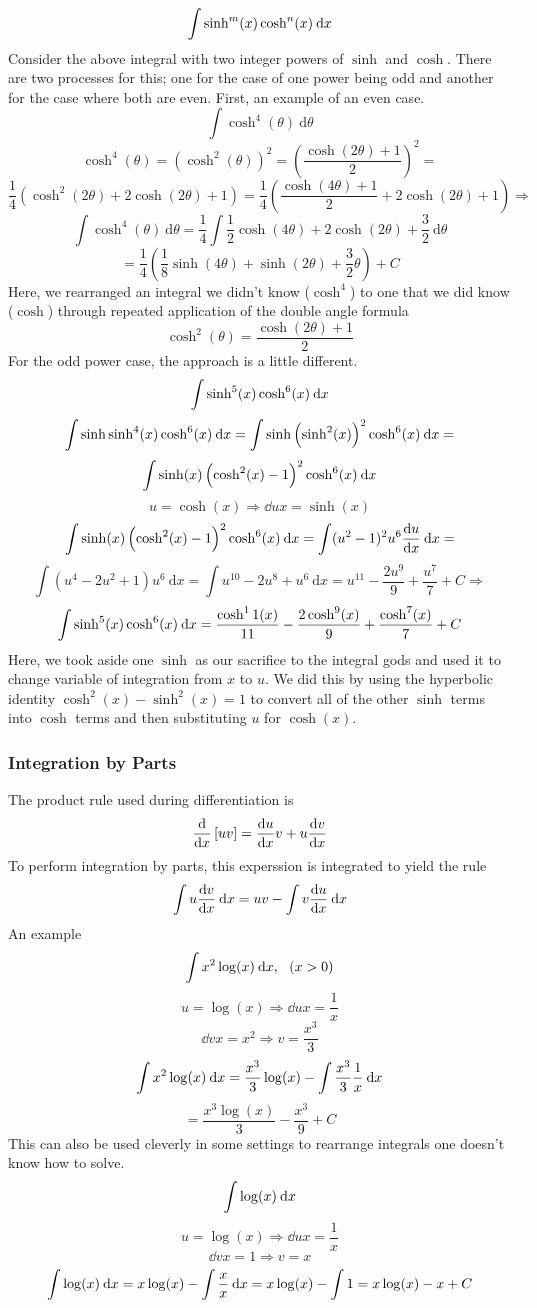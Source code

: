 \documentclass[12pt]{report}
\begin{document}
\begin{flushleft}
\[\int \sinh^m(x)\cosh^n(x)\:\mathrm{d}x\]
Consider the above integral with two integer powers of \(\sinh\) and \(\cosh\).
There are two processes for this; one for the case of one power being odd and
another for the case where both are even. First, an example of an even case.
\[\int \cosh^4(\theta) \:\mathrm{d}\theta\]
\[\cosh^4(\theta) = \left(\cosh^2(\theta)\right)^2 
= \left(\frac{\cosh(2\theta) + 1}{2}\right)^2 = \]
\[\frac{1}{4}\left(\cosh^2(2\theta) + 2\cosh(2\theta) + 1\right) 
= \frac{1}{4}\left(\frac{\cosh(4\theta) + 1}{2} + 2\cosh(2\theta) + 1\right)
\Rightarrow \]
\[\int \cosh^4(\theta) \:\mathrm{d}\theta = \frac{1}{4}\int\frac{1}{2}
\cosh(4\theta) + 2\cosh(2\theta) + \frac{3}{2}  \:\mathrm{d}\theta\]
\[= \frac{1}{4}\left(\frac{1}{8}\sinh(4\theta) + \sinh(2\theta) 
+ \frac{3}{2}\theta\right) + C\]
Here, we rearranged an integral we didn't know (\(\cosh^4\)) to one that we did
know (\(\cosh\)) through repeated application of the double angle formula
\[\cosh^2(\theta) = \frac{\cosh(2\theta) + 1}{2}\]
For the odd power case, the approach is a little different.
\[\int\sinh^5(x)\cosh^6(x)\:\mathrm{d}x\]
\[\int\sinh\sinh^4(x)\cosh^6(x)\:\mathrm{d}x = \int\sinh\left(\sinh^2(x)\right)^2
\cosh^6(x)\:\mathrm{d}x = \]
\[\int\sinh(x)\left(\cosh^2(x) - 1\right)^2\cosh^6(x)\:\mathrm{d}x\]
\[u = \cosh(x) \Rightarrow \dd{u}{x} = \sinh(x)\]
\[\int\sinh(x)\left(\cosh^2(x) - 1\right)^2\cosh^6(x)\:\mathrm{d}x 
= \int(u^2 - 1)^2u^6\frac{\mathrm{d}u}{\mathrm{d}x} \:\mathrm{d}x = \]
\[\int(u^4 - 2u^2 + 1)u^6 \:\mathrm{d}x = \int u^{10} - 2u^8 + u^6
\:\mathrm{d}x = u^{11} - \frac{2u^9}{9} + \frac{u^7}{7} + C \Rightarrow\]
\[\int\sinh^5(x)\cosh^6(x)\:\mathrm{d}x = \frac{\cosh^11(x)}{11} 
- \frac{2\cosh^9(x)}{9} + \frac{\cosh^7(x)}{7} + C\]
Here, we took aside one \(\sinh\) as our sacrifice to the integral gods and
used it to change variable of integration from \(x\) to \(u\). We did this by
using the hyperbolic identity \(\cosh^2(x) - \sinh^2(x) = 1\) to convert all of
the other \(\sinh\) terms into \(\cosh\) terms and then substituting \(u\) for
\(\cosh(x)\).

\subsubsection*{Integration by Parts}

The product rule used during differentiation is
\[\frac{\mathrm{d}}{\mathrm{d}x}\left[uv\right] = \frac{\mathrm{d}u}{\mathrm{d}x}v + u\frac{\mathrm{d}v}{\mathrm{d}x}\]
To perform integration by parts, this experssion is integrated to yield the
rule
\[\int u\frac{\mathrm{d}v}{\mathrm{d}x} \:\mathrm{d}x = uv - \int v\frac{\mathrm{d}u}{\mathrm{d}x} \:\mathrm{d}x\]
An example
\[\int x^2\log(x)\:\mathrm{d}x, \:\:\: (x > 0)\]
\[u = \log(x) \Rightarrow \dd{u}{x} = \frac{1}{x}\]
\[\dd{v}{x} = x^2 \Rightarrow v = \frac{x^3}{3}\]
\[\int x^2\log(x) \:\mathrm{d}x = \frac{x^3}{3}\log(x) -\int\frac{x^3}{3}\frac{1}{x}\:\mathrm{d}x\]
\[= \frac{x^3\log(x)}{3} - \frac{x^3}{9} + C\]
This can also be used cleverly in some settings to rearrange integrals one
doesn't know how to solve.
\[\int\log(x)\:\mathrm{d}x\]
\[u = \log(x) \Rightarrow \dd{u}{x} = \frac{1}{x}\]
\[\dd{v}{x} = 1 \Rightarrow v = x\]
\[\int\log(x)\:\mathrm{d}x = x\log(x) - \int \frac{x}{x} \:\mathrm{d}x = x\log(x) - \int 1 
= x\log(x) - x + C\]


\end{flushleft}
\end{document}
